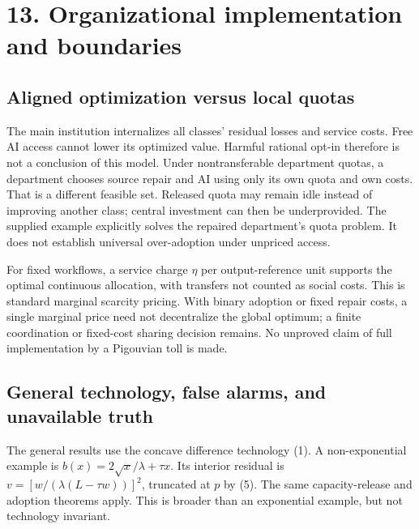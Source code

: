 \documentclass[
  11pt,
  a4paper,
]{article}
\begin{document}
\hypertarget{organizational-implementation-and-boundaries}{%
\section{13. Organizational implementation and
boundaries}\label{organizational-implementation-and-boundaries}}

\hypertarget{aligned-optimization-versus-local-quotas}{%
\subsection{Aligned optimization versus local
quotas}\label{aligned-optimization-versus-local-quotas}}

The main institution internalizes all classes' residual losses and
service costs. Free AI access cannot lower its optimized value. Harmful
rational opt-in therefore is not a conclusion of this model. Under
nontransferable department quotas, a department chooses source repair
and AI using only its own quota and own costs. That is a different
feasible set. Released quota may remain idle instead of improving
another class; central investment can then be underprovided. The
supplied example explicitly solves the repaired department's quota
problem. It does not establish universal over-adoption under unpriced
access.

For fixed workflows, a service charge \(\eta\) per output-reference unit
supports the optimal continuous allocation, with transfers not counted
as social costs. This is standard marginal scarcity pricing. With binary
adoption or fixed repair costs, a single marginal price need not
decentralize the global optimum; a finite coordination or fixed-cost
sharing decision remains. No unproved claim of full implementation by a
Pigouvian toll is made.

\hypertarget{general-technology-false-alarms-and-unavailable-truth}{%
\subsection{General technology, false alarms, and unavailable
truth}\label{general-technology-false-alarms-and-unavailable-truth}}

The general results use the concave difference technology (1). A
non-exponential example is \(b(x)=2\sqrt{x}/\lambda+\tau x\). Its
interior residual is \(v=[w/(\lambda(L-\tau w))]^2\), truncated at \(p\)
by (5). The same capacity-release and adoption theorems apply. This is
broader than an exponential example, but not technology invariant.
\end{document}
